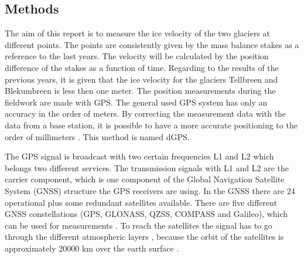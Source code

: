 
\subsection{Methods}\label{GPS:subsec:methods}

The aim of this report is to measure the ice velocity of the two glaciers at different points. 
The points are consistently given by the mass balance stakes as a reference to the last years.
The velocity will be calculated by the position difference of the stakes as a function of time.
Regarding to the results of the previous years, it is given that the ice velocity for the glaciers Tellbreen and Blekumbreen is less then one meter.
The position measurements during the fieldwork are made with GPS. 
The general used GPS system has only an accuracy in the order of meters.
By correcting the measurement data with the data from a base station, it is possible to have a more accurate positioning to the order of millimeters \citep{UGPS}. This method is named dGPS.
\medskip

The GPS signal is broadcast with two certain frequencies L1 and L2 which belongs two different services.
The transmission signals with L1 and L2 are the carrier component, which is one component of the Global Navigation Satellite System (GNSS) structure the GPS receivers are using.
In the GNSS there are 24 operational plus some redundant satellites available.
There are five different GNSS constellations (GPS, GLONASS, QZSS, COMPASS and Galileo), which can be used for measurements \citep{Trprocess}.
To reach the satellites the signal has to go through the different atmospheric layers \citep{churcherdgps},
because the orbit of the satellites is approximately 20000 km over the earth surface \citep{Trprocess}.
\medskip


